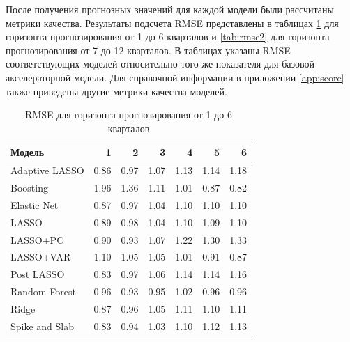 После получения прогнозных значений для каждой модели были рассчитаны метрики качества. Результаты подсчета RMSE представлены в таблицах \ref{tab:rmse1} для горизонта прогнозирования от 1 до 6 кварталов и \ref{tab:rmse2} для горизонта прогнозирования от 7 до 12 кварталов. В таблицах указаны RMSE соответствующих моделей относительно того же показателя для базовой акселераторной модели. Для справочной информации в приложении \ref{app:score} также приведены другие метрики качества моделей. 



\begin{table}[ht]
\centering
\caption{RMSE для горизонта прогнозирования от 1 до 6 кварталов}
\label{tab:rmse1}
\begin{tabular}{lrrrrrr}
  \hline
Модель & 1 & 2 & 3 & 4 & 5 & 6 \\ 
  \hline
Adaptive LASSO & 0.86 & 0.97 & 1.07 & 1.13 & 1.14 & 1.18 \\ 
  Boosting & 1.96 & 1.36 & 1.11 & 1.01 & 0.87 & 0.82 \\ 
  Elastic Net & 0.87 & 0.97 & 1.04 & 1.10 & 1.10 & 1.10 \\ 
  LASSO & 0.89 & 0.98 & 1.04 & 1.10 & 1.09 & 1.10 \\ 
  LASSO+PC & 0.90 & 0.93 & 1.07 & 1.22 & 1.30 & 1.33 \\ 
  LASSO+VAR & 1.10 & 1.05 & 1.05 & 1.01 & 0.91 & 0.87 \\ 
  Post LASSO & 0.83 & 0.97 & 1.06 & 1.14 & 1.14 & 1.16 \\ 
  Random Forest & 0.96 & 0.93 & 0.95 & 1.02 & 0.96 & 0.96 \\ 
  Ridge & 0.87 & 0.96 & 1.05 & 1.11 & 1.10 & 1.11 \\ 
  Spike and Slab & 0.83 & 0.94 & 1.03 & 1.10 & 1.12 & 1.13 \\ 
   \hline
\end{tabular}
\end{table}

